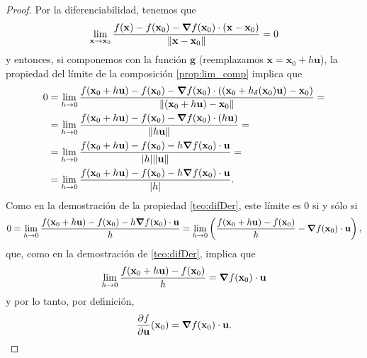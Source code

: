 \begin{theorem}
\begin{proof}
Por la diferenciabilidad, tenemos que 
\[
 \lim_{\mathbf{x} \to \mathbf{x}_0} \frac{f(\mathbf{x}) - f(\mathbf{x}_0) - \grad f (\mathbf{x}_0) \cdot (\mathbf{x} - \mathbf{x}_0)}
                                 {\norm{\mathbf{x} - \mathbf{x}_0}} = 0
\]
y entonces, si componemos con la funci\'on $\mathbf{g}$ (reemplazamos $\mathbf{x} = \mathbf{x}_0 + h {\mathbf{u}}$), la propiedad del l\'imite de la composici\'on \eqref{prop:lim_comp} implica que
\begin{align*}
  0 & = \lim_{h \to 0} \frac{f(\mathbf{x}_0 + h {\mathbf{u}}) - f(\mathbf{x}_0) - \grad f (\mathbf{x}_0) \cdot ((\mathbf{x}_0 + h _{\delta}(\mathbf{x}_0){\mathbf{u}}) - \mathbf{x}_0) }
                    {\norm{(\mathbf{x}_0 + h {\mathbf{u}}) - \mathbf{x}_0}} = \\
    & = \lim_{h \to 0} \frac{f(\mathbf{x}_0 + h {\mathbf{u}}) - f(\mathbf{x}_0) - \grad f (\mathbf{x}_0) \cdot (h {\mathbf{u}}) }
                    {\norm{h {\mathbf{u}}}} = \\
    & = \lim_{h \to 0} \frac{f(\mathbf{x}_0 + h {\mathbf{u}}) - f(\mathbf{x}_0) - h \grad f (\mathbf{x}_0) \cdot {\mathbf{u}} }
                    {\abs{h} \norm{{\mathbf{u}}}} = \\
    & = \lim_{h \to 0} \frac{f(\mathbf{x}_0 + h {\mathbf{u}}) - f(\mathbf{x}_0) - h \grad f (\mathbf{x}_0) \cdot {\mathbf{u}} }
                    {\abs{h}}.  
\end{align*}                                
Como en la demostraci\'on de la propiedad \eqref{teo:difDer}, este l\'imite es $0$ si y s\'olo si
\[
 0 = \lim_{h \to 0} \frac{f(\mathbf{x}_0 + h {\mathbf{u}}) - f(\mathbf{x}_0) - h \grad f (\mathbf{x}_0) \cdot {\mathbf{u}}}{h} = 
     \lim_{h \to 0} \left( \frac{f(\mathbf{x}_0 + h {\mathbf{u}}) - f(\mathbf{x}_0)}{h} - \grad f (\mathbf{x}_0) \cdot {\mathbf{u}} \right),
\]
que, como en la demostraci\'on de \eqref{teo:difDer}, implica que 
\[
 \lim_{h \to 0} \frac{f(\mathbf{x}_0 + h {\mathbf{u}}) - f(\mathbf{x}_0)}{h} = \grad f (\mathbf{x}_0) \cdot {\mathbf{u}}
\]
y por lo tanto, por definici\'on,
\[
 \frac{\partial f}{\partial {\mathbf{u}}} (\mathbf{x}_0) = \grad f (\mathbf{x}_0) \cdot {\mathbf{u}}.
\]
 \end{proof}
\end{theorem}

